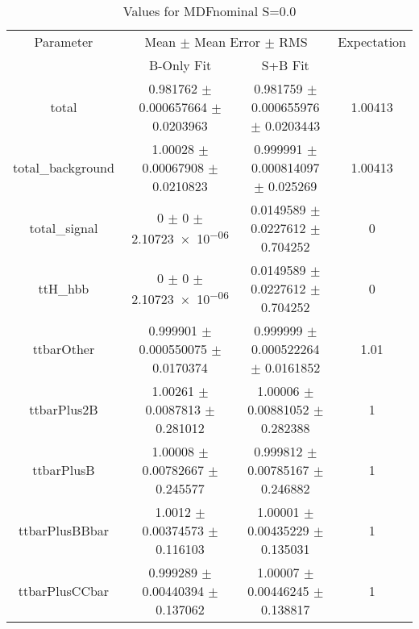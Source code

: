 \begin{table}
\centering
\caption{Values for MDFnominal S=0.0}
\begin{tabular}{cccc}
\toprule
Parameter & \multicolumn{2}{c}{Mean $\pm$ Mean Error $\pm$ RMS} & Expectation\\
 & B-Only Fit & S+B Fit & \\
\midrule
total & \num{0.981762} $\pm$ \num{0.000657664} $\pm$ \num{0.0203963} & \num{0.981759} $\pm$ \num{0.000655976} $\pm$ \num{0.0203443} & \num{1.00413}\\
total\_background & \num{1.00028} $\pm$ \num{0.00067908} $\pm$ \num{0.0210823} & \num{0.999991} $\pm$ \num{0.000814097} $\pm$ \num{0.025269} & \num{1.00413}\\
total\_signal & \num{0} $\pm$ \num{0} $\pm$ \num{2.10723e-06} & \num{0.0149589} $\pm$ \num{0.0227612} $\pm$ \num{0.704252} & \num{0}\\
ttH\_hbb & \num{0} $\pm$ \num{0} $\pm$ \num{2.10723e-06} & \num{0.0149589} $\pm$ \num{0.0227612} $\pm$ \num{0.704252} & \num{0}\\
ttbarOther & \num{0.999901} $\pm$ \num{0.000550075} $\pm$ \num{0.0170374} & \num{0.999999} $\pm$ \num{0.000522264} $\pm$ \num{0.0161852} & \num{1.01}\\
ttbarPlus2B & \num{1.00261} $\pm$ \num{0.0087813} $\pm$ \num{0.281012} & \num{1.00006} $\pm$ \num{0.00881052} $\pm$ \num{0.282388} & \num{1}\\
ttbarPlusB & \num{1.00008} $\pm$ \num{0.00782667} $\pm$ \num{0.245577} & \num{0.999812} $\pm$ \num{0.00785167} $\pm$ \num{0.246882} & \num{1}\\
ttbarPlusBBbar & \num{1.0012} $\pm$ \num{0.00374573} $\pm$ \num{0.116103} & \num{1.00001} $\pm$ \num{0.00435229} $\pm$ \num{0.135031} & \num{1}\\
ttbarPlusCCbar & \num{0.999289} $\pm$ \num{0.00440394} $\pm$ \num{0.137062} & \num{1.00007} $\pm$ \num{0.00446245} $\pm$ \num{0.138817} & \num{1}\\
\bottomrule
\end{tabular}
\end{table}